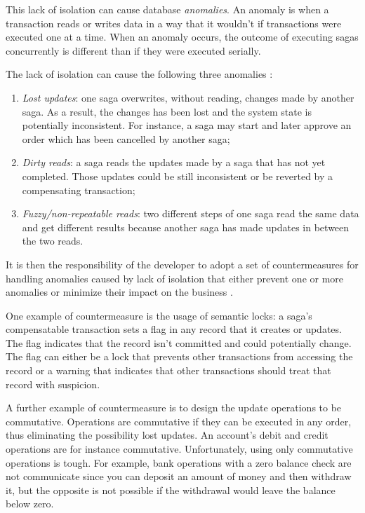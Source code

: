 \documentclass[conference]{IEEEtran}
\begin{document}
This lack of isolation can cause database \textit{anomalies}. An anomaly is when a transaction reads or writes data in a way that it wouldn't if transactions were executed one at a time. When an anomaly occurs, the outcome of executing sagas concurrently is different than if they were executed serially.

The lack of isolation can cause the following three anomalies \cite{microservices-patterns-anomalies}:

\begin{enumerate}
  \item \textit{Lost updates}: one saga overwrites, without reading, changes made by another saga. As a result, the changes has been lost and the system state is potentially inconsistent. For instance, a saga may start and later approve an order which has been cancelled by another saga;
  \item \textit{Dirty reads}: a saga reads the updates made by a saga that has not yet completed. Those updates could be still inconsistent or be reverted by a compensating transaction;
  \item \textit{Fuzzy/non-repeatable reads}: two different steps of one saga read the same data and get different results because another saga has made updates in between the two reads.
\end{enumerate}

It is then the responsibility of the developer to adopt a set of countermeasures for handling anomalies caused by lack of isolation that either prevent one or more anomalies or minimize their impact on the business \cite{semantic-acid}.

One example of countermeasure is the usage of semantic locks: a saga's compensatable transaction sets a flag in any record that it creates or updates. The flag indicates that the record isn't committed and could potentially change. The flag can either be a lock that prevents other transactions from accessing the record or a warning that indicates that other transactions should treat that record with suspicion.

A further example of countermeasure is to design the update operations to be commutative. Operations are commutative if they can be executed in any order, thus eliminating the possibility lost updates. An account's debit and credit operations are for instance commutative. Unfortunately, using only commutative operations is tough. For example, bank operations with a zero balance check are not communicate since you can deposit an amount of money and then withdraw it, but the opposite is not possible if the withdrawal would leave the balance below zero.
\end{document}
